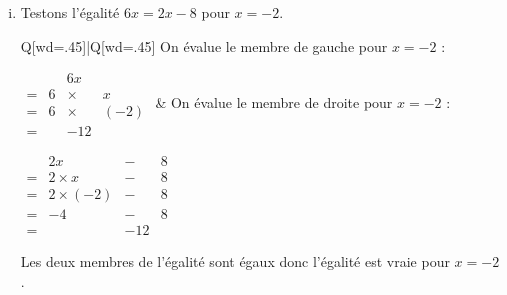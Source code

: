 \documentclass[../main.tex]{subfiles}
\begin{document}
\begin{exemple}
\begin{enumerate}[i), font=\bfseries]
                est fausse pour $x=3$.
                \item Testons l'égalité $6x=2x-8$ pour $x=-2$.
                \vskip 10pt
                \begin{tblr}{Q[wd=.45\linewidth]|Q[wd=.45\linewidth]}
                    On évalue le membre de gauche pour $x=-2$ :
                    \par\vskip 10pt\hskip 30pt
                    $\begin{array}{cccc}
                        &&6x&\\
                        =&6&\times&x\\
                        =&6&\times&(-2)\\
                        =&&-12&
                    \end{array}$
                    &
                    On évalue le membre de droite pour $x=-2$ :
                    \par\vskip 10pt\hskip 30pt
                    $\begin{array}{cccc}
                        &2x&-&8\\
                        =&2\times x&-&8\\
                        =&2\times(-2)&-&8\\
                        =&-4&-&8\\
                        =&&-12&
                    \end{array}$
                \end{tblr}\vskip 10pt%
                Les deux membres de l'égalité sont égaux donc l'égalité
                est vraie pour $x=-2$.
            \end{enumerate}
        \end{exemple}
        \newpage
\end{document}
